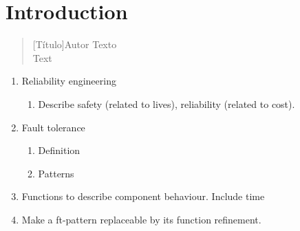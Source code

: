 \chapter{Introduction}

\begin{quotation}[Título]{Autor}
Texto \\
Text
\end{quotation}

\begin{enumerate}
  \item Reliability engineering
  \begin{enumerate}
    \item Describe safety (related to lives), reliability (related to cost).
  \end{enumerate}
  \item Fault tolerance
  \begin{enumerate}
    \item Definition
    \item Patterns
  \end{enumerate}
  \item Functions to describe component behaviour. Include time
  \item Make a ft-pattern replaceable by its function refinement.
\end{enumerate}
